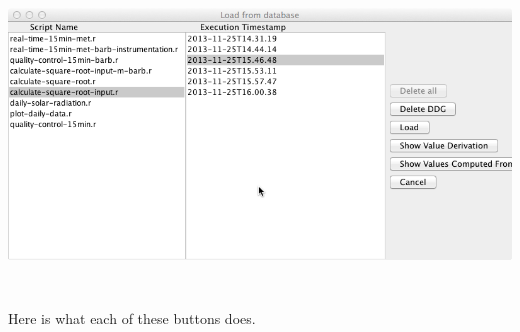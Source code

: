 \documentclass[letterpaper]{article}
\begin{document}
 \includegraphics[width=6.5in,height=3.25in]{UsingDDGExplorer-img/UsingDDGExplorer-img007.png} 

{\mdseries\upshape\color{black}
Here is what each of these buttons does.}
\end{document}
